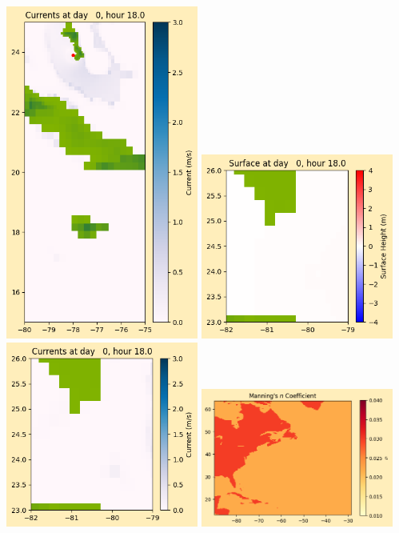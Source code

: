 \documentclass[11pt]{article}
\begin{document}
\includegraphics[width=0.475\textwidth]{frame0015fig1008.png}
\vskip 10pt 
\includegraphics[width=0.475\textwidth]{frame0015fig1009.png}
\includegraphics[width=0.475\textwidth]{frame0015fig1010.png}
\vskip 10pt 
\includegraphics[width=0.475\textwidth]{frame0015fig1011.png}
\end{document}
